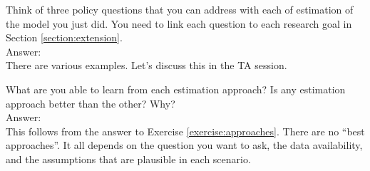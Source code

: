 \begin{exercise}
Think of three policy questions that you can address with each of estimation of the model you just did. You need to link each question to each research goal in Section \ref{section:extension}.\\
\noindent Answer:\\
\noindent There are various examples. Let's discuss this in the TA session.
\end{exercise}

\begin{exercise}
What are you able to learn from each estimation approach? Is any estimation approach better than the other? Why?\\
\noindent Answer:\\
\noindent This follows from the answer to Exercise \ref{exercise:approaches}. There are no ``best approaches''. It all depends on the question you want to ask, the data availability, and the assumptions that are plausible in each scenario.
\end{exercise}